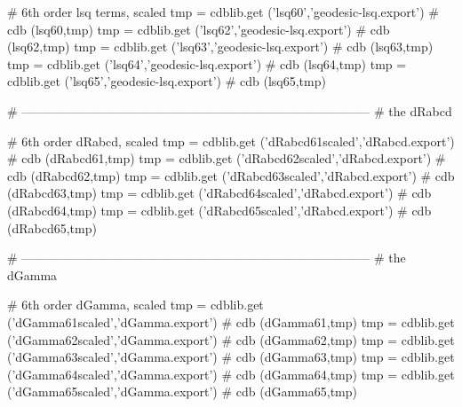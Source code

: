 \documentclass[12pt]{cdblatex}
\begin{document}
\begin{cadabra}
   # 6th order lsq terms, scaled
   tmp = cdblib.get ('lsq60','geodesic-lsq.export')  # cdb (lsq60,tmp)
   tmp = cdblib.get ('lsq62','geodesic-lsq.export')  # cdb (lsq62,tmp)
   tmp = cdblib.get ('lsq63','geodesic-lsq.export')  # cdb (lsq63,tmp)
   tmp = cdblib.get ('lsq64','geodesic-lsq.export')  # cdb (lsq64,tmp)
   tmp = cdblib.get ('lsq65','geodesic-lsq.export')  # cdb (lsq65,tmp)

   # ------------------------------------------------------------------------------------
   # the dRabcd

   # 6th order dRabcd, scaled
   tmp = cdblib.get ('dRabcd61scaled','dRabcd.export')  # cdb (dRabcd61,tmp)
   tmp = cdblib.get ('dRabcd62scaled','dRabcd.export')  # cdb (dRabcd62,tmp)
   tmp = cdblib.get ('dRabcd63scaled','dRabcd.export')  # cdb (dRabcd63,tmp)
   tmp = cdblib.get ('dRabcd64scaled','dRabcd.export')  # cdb (dRabcd64,tmp)
   tmp = cdblib.get ('dRabcd65scaled','dRabcd.export')  # cdb (dRabcd65,tmp)

   # ------------------------------------------------------------------------------------
   # the dGamma

   # 6th order dGamma, scaled
   tmp = cdblib.get ('dGamma61scaled','dGamma.export')  # cdb (dGamma61,tmp)
   tmp = cdblib.get ('dGamma62scaled','dGamma.export')  # cdb (dGamma62,tmp)
   tmp = cdblib.get ('dGamma63scaled','dGamma.export')  # cdb (dGamma63,tmp)
   tmp = cdblib.get ('dGamma64scaled','dGamma.export')  # cdb (dGamma64,tmp)
   tmp = cdblib.get ('dGamma65scaled','dGamma.export')  # cdb (dGamma65,tmp)

\end{cadabra}
\end{document}
